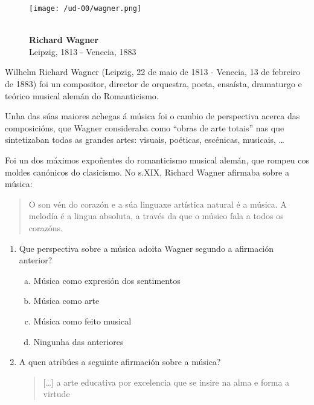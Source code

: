 \begin{ejercicio}

\begin{wrapfigure}{r}{0.30\textwidth} 
\begin{center} 
\texttt{[image: /ud-00/wagner.png]} 
\end{center} 
\caption{\\ \textbf{Richard Wagner} \\ 
Leipzig, 1813 - Venecia, 1883} 
\label{fig:wagner}
\end{wrapfigure}

Wilhelm Richard Wagner (Leipzig, 22 de maio de 1813 - Venecia, 13 de febreiro de 1883) foi un compositor, director de orquestra, poeta, ensaísta, dramaturgo e teórico musical alemán do Romanticismo.

Unha das súas maiores achegas á música foi o cambio de perspectiva acerca das composicións, que Wagner consideraba como ``obras de arte totais'' nas que sintetizaban todas as grandes artes: visuais, poéticas, escénicas, musicais, \ldots

Foi un dos máximos expoñentes do romanticismo musical alemán, que rompeu cos moldes canónicos do clasicismo. 
No s.{\scriptsize XIX}, Richard Wagner afirmaba sobre a música:

    \begin{quotation}{\small
     \noindent
     O son vén do corazón e a súa linguaxe artística natural é a música. A melodía é a lingua absoluta, a través da que o músico fala a todos os corazóns.}
    \end{quotation}
 
\begin{enumerate}[1)]
 \item 
 Que perspectiva sobre a música adoita Wagner segundo a afirmación anterior?
 \begin{enumerate}[a)]
  \item 
  Música como expresión dos sentimentos
  \item %
  Música como arte
  \item 
  Música como feito musical
  \item
  Ningunha das anteriores
 \end{enumerate}
 \item 
 A quen atribúes a seguinte afirmación sobre a música? \dotfill
     \begin{quote}
    {%
    [\ldots] a arte educativa por excelencia que se insire na alma e forma a virtude
    }
    \end{quote}
\end{enumerate}
\end{ejercicio}

